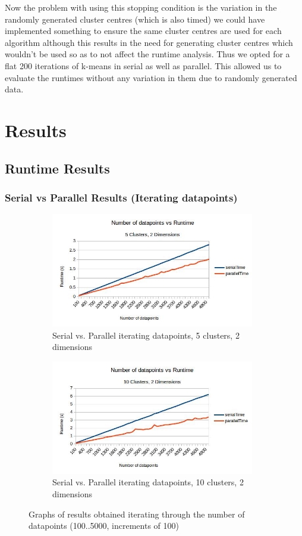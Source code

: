 \documentclass{article}
\begin{document}
Now the problem with using this stopping condition is the variation in the randomly generated cluster centres (which is also timed) we could have implemented something to ensure the same cluster centres are used for each algorithm although this results in the need for generating cluster centres which wouldn't be used so as to not affect the runtime analysis. Thus we opted for a flat 200 iterations of k-means in serial as well as parallel. This allowed us to evaluate the runtimes without any variation in them due to randomly generated data.

\newpage
\section{Results}
\subsection{Runtime Results}
\subsubsection{Serial vs Parallel Results (Iterating datapoints)}
\begin{figure}[h!]
    \begin{subfigure}{0.5\textwidth}
        \includegraphics[width=0.9\linewidth, height=5cm]{Pictures/datapoints1.jpg}
        \caption{Serial vs. Parallel iterating datapoints, 5 clusters, 2 dimensions}
    \end{subfigure}
    \begin{subfigure}{0.5\textwidth}
        \includegraphics[width=0.9\linewidth, height=5cm]{Pictures/datapoints2.jpg}
        \caption{Serial vs. Parallel iterating datapoints, 10 clusters, 2 dimensions}
    \end{subfigure}
\caption{Graphs of results obtained iterating through the number of datapoints (100..5000, increments of 100)}
\end{figure}
\end{document}

